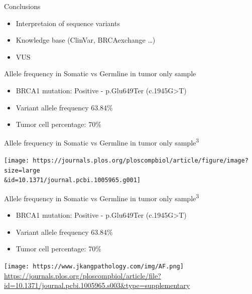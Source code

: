 \documentclass[
  ignorenonframetext,
]{beamer}
\providecommand{\tightlist}{%
  \setlength{\itemsep}{0pt}\setlength{\parskip}{0pt}}
\begin{document}
\begin{frame}{Conclusions}
\protect\hypertarget{conclusions}{}

\begin{itemize}
\tightlist
\item
  Interpretaion of sequence variants
\item
  Knowledge base (ClinVar, BRCAexchange \ldots{})
\item
  VUS
\end{itemize}

\end{frame}

\begin{frame}{Allele frequency in Somatic vs Germline in tumor only
sample}
\protect\hypertarget{allele-frequency-in-somatic-vs-germline-in-tumor-only-sample}{}

\begin{itemize}
\tightlist
\item
  BRCA1 mutation: Positive - p.Glu649Ter (c.1945G\textgreater{}T)\\
\item
  Variant allele frequency 63.84\%\\
\item
  Tumor cell percentage: 70\%
\end{itemize}

\end{frame}

\begin{frame}{Allele frequency in Somatic vs Germline in tumor only
sample\textsuperscript{3}}
\protect\hypertarget{allele-frequency-in-somatic-vs-germline-in-tumor-only-sample-sun_2018_computational_ploscomputationalbiology}{}

\texttt{[image: https://journals.plos.org/ploscompbiol/article/figure/image?size=large\\\&id=10.1371/journal.pcbi.1005965.g001]}

\end{frame}

\begin{frame}{Allele frequency in Somatic vs Germline in tumor only
sample\textsuperscript{3}}
\protect\hypertarget{allele-frequency-in-somatic-vs-germline-in-tumor-only-sample-sun_2018_computational_ploscomputationalbiology-1}{}

\begin{itemize}
\tightlist
\item
  BRCA1 mutation: Positive - p.Glu649Ter (c.1945G\textgreater{}T)\\
\item
  Variant allele frequency 63.84\%\\
\item
  Tumor cell percentage: 70\%
\end{itemize}

\texttt{[image: https://www.jkangpathology.com/img/AF.png]}
\url{https://journals.plos.org/ploscompbiol/article/file?id=10.1371/journal.pcbi.1005965.s003\&type=supplementary}

\end{frame}
\end{document}
